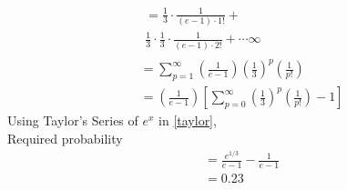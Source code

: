 \documentclass[journal,12pt,twocolumn]{IEEEtran}
\begin{document}
\begin{align}
&\begin{multlined}
=\frac{1}{3}\cdot\frac{1}{(e-1)\cdot 1!}+\\
\frac{1}{3}\cdot \frac{1}{3}\cdot\frac{1}{(e-1)\cdot 2!}+\cdots \infty
\end{multlined}\\
&=\sum_{p=1}^{\infty}\left(\frac{1}{e-1}\right)\left(\frac{1}{3}\right)^p\left(\frac{1}{p!}\right)\\
&=\left(\frac{1}{e-1}\right)\left[\sum_{p=0}^{\infty}\left(\frac{1}{3}\right)^p\left(\frac{1}{p!}\right)-1\right]\label{taylor}
\end{align}
Using Taylor's Series of $e^x$ in \eqref{taylor}, \\
Required probability
\begin{align}
    &=\frac{e^{1/3}}{e-1}-\frac{1}{e-1}\\
    &=0.23
\end{align}
    
\end{document}
